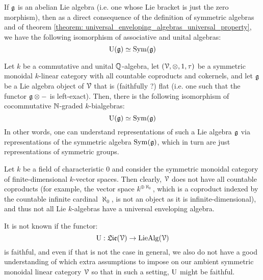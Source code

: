         \begin{example}
            If $\mathfrak{g}$ is an abelian Lie algebra (i.e. one whose Lie bracket is just the zero morphism), then as a direct consequence of the definition of symmetric algebras and of theorem \ref{theorem: universal_enveloping_algebras_universal_property}, we have the following isomorphism of associative and unital algebras:
                $$\mathrm{U}(\mathfrak{g}) \simeq \mathrm{Sym}(\mathfrak{g})$$
        \end{example}
        \begin{example}
            Let $k$ be a commutative and unital $\mathbb{Q}$-algebra, let $(\calV, \tensor, 1, \tau)$ be a symmetric monoidal $k$-linear category with all countable coproducts and cokernels, and let $\mathfrak{g}$ be a Lie algebra object of $\mathcal{V}$ that is (faithfully ?) flat (i.e. one such that the functor $\g \tensor -$ is left-exact). Then, there is the following isomorphism of cocommutative $\mathbb{N}$-graded $k$-bialgebras:
                $$\mathrm{U}(\mathfrak{g}) \simeq \mathrm{Sym}(\mathfrak{g})$$
            In other words, one can understand representations of such a Lie algebra $\mathfrak{g}$ via representations of the symmetric algebra $\mathrm{Sym}(\mathfrak{g})$, which in turn are just representations of symmetric groups.
        \end{example}
        \begin{example}
            Let $k$ be a field of characteristic $0$ and consider the symmetric monoidal category of finite-dimensional $k$-vector spaces. Then clearly, $\mathcal{V}$ does not have all countable coproducts (for example, the vector space $k^{\oplus \aleph_0}$, which is a coproduct indexed by the countable infinite cardinal $\aleph_0$, is not an object as it is infinite-dimensional), and thus not all Lie $k$-algebras have a universal enveloping algebra.
        \end{example}
        \begin{example}
            It is not known if the functor:
                $$\mathrm{U}: \mathfrak{Lie}(\mathcal{V}) \to \mathrm{Lie}\mathrm{Alg}(\mathcal{V})$$
            is faithful, and even if that is not the case in general, we also do not have a good understanding of which extra assumptions to impose on our ambient symmetric monoidal linear category $\mathcal{V}$ so that in such a setting, $\mathrm{U}$ might be faithful. 
        \end{example}
        
